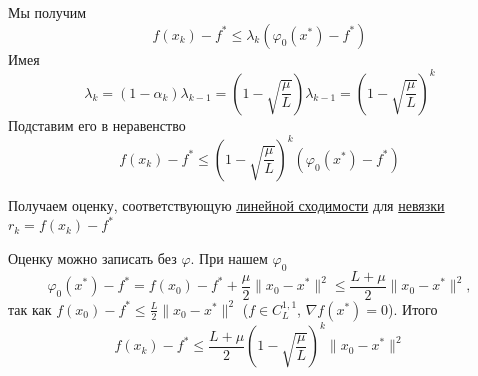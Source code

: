  Мы получим
 \[
f(x_k) - f^{*} \le \lambda_k(\varphi_0(x^{*}) - f^{*})
\]
Имея
\[
\lambda_k = (1-\alpha_k)\lambda_{k-1} = \left( 1 - \sqrt{\frac{\mu}{L}} \right) \lambda_{k-1} = \left( 1 - \sqrt{\frac{\mu}{L}} \right)^k
\]
Подставим его в неравенство
\[
f(x_k) - f^{*} \le \left( 1 - \sqrt{\frac{\mu}{L}} \right)^k  (\varphi_0(x^{*}) - f^{*})
\]

Получаем оценку, соответствующую \hyperref[note:DF2405BF-8B31-47EB-8DEF-B1A88034717C]{линейной сходимости} для \hyperref[note:C42D2C19-B35F-4C0E-AFEB-D880CBB72176]{невязки} $r_k = f(x_k) - f^{*}$

\begin{remark}
  Оценку можно записать без $\varphi$. При нашем $\varphi_0$
  \[
  \varphi_0(x^{*}) - f^{*} = f(x_0) - f^{*} + \frac{\mu}{2}\|x_0 - x^{*}\|^2 \le \frac{L + \mu}{2}\|x_0 - x^{*}\|^2,
  \]
  так как $f(x_0) - f^{*} \le \frac{L}{2}\|x_0 - x^{*}\|^2$ ($f \in C^{1,1}_L$, $\nabla f(x^{*}) = 0$). Итого
  \[
  f(x_k) - f^{*} \le \frac{L + \mu}{2}\left( 1 - \sqrt{\frac{\mu}{L}} \right)^k \|x_0 - x^{*}\|^2
  \]
\end{remark}

